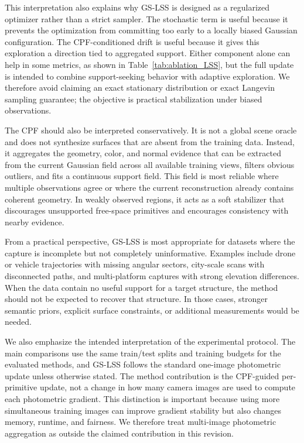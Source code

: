 \documentclass[lettersize,journal]{IEEEtran}
\begin{document}
This interpretation also explains why GS-LSS is designed as a regularized optimizer rather than a strict sampler. The stochastic term is useful because it prevents the optimization from committing too early to a locally biased Gaussian configuration. The CPF-conditioned drift is useful because it gives this exploration a direction tied to aggregated support. Either component alone can help in some metrics, as shown in Table~\ref{tab:ablation_LSS}, but the full update is intended to combine support-seeking behavior with adaptive exploration. We therefore avoid claiming an exact stationary distribution or exact Langevin sampling guarantee; the objective is practical stabilization under biased observations.

The CPF should also be interpreted conservatively. It is not a global scene oracle and does not synthesize surfaces that are absent from the training data. Instead, it aggregates the geometry, color, and normal evidence that can be extracted from the current Gaussian field across all available training views, filters obvious outliers, and fits a continuous support field. This field is most reliable where multiple observations agree or where the current reconstruction already contains coherent geometry. In weakly observed regions, it acts as a soft stabilizer that discourages unsupported free-space primitives and encourages consistency with nearby evidence.

From a practical perspective, GS-LSS is most appropriate for datasets where the capture is incomplete but not completely uninformative. Examples include drone or vehicle trajectories with missing angular sectors, city-scale scans with disconnected paths, and multi-platform captures with strong elevation differences. When the data contain no useful support for a target structure, the method should not be expected to recover that structure. In those cases, stronger semantic priors, explicit surface constraints, or additional measurements would be needed.

We also emphasize the intended interpretation of the experimental protocol. The main comparisons use the same train/test splits and training budgets for the evaluated methods, and GS-LSS follows the standard one-image photometric update unless otherwise stated. The method contribution is the CPF-guided per-primitive update, not a change in how many camera images are used to compute each photometric gradient. This distinction is important because using more simultaneous training images can improve gradient stability but also changes memory, runtime, and fairness. We therefore treat multi-image photometric aggregation as outside the claimed contribution in this revision.
\end{document}
